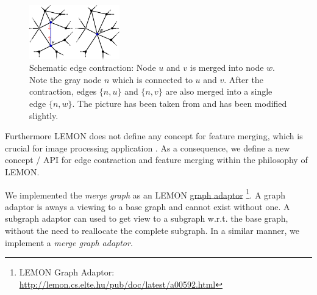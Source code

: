 \begin{figure}[H]
    \centering
    \includegraphics[width=0.35\textwidth]{fig/contraction.pdf}

    \caption[Schematic edge contraction]{ Schematic edge contraction: Node $u$ and $v$ is merged into node $w$.
        Note the gray node $n$ which is connected to $u$ and $v$.
        After the contraction, edges $\{ n,u\}$ and $\{ n,v\}$ are also merged into 
        a single edge $\{ n, w\}$.
        The picture has been taken from \citep{wiki_edge_contraction} and has been modified slightly.
    }
    \label{fig:figlabel}
\end{figure}


Furthermore LEMON does not define any concept for feature merging, which
is crucial for image processing application \citep{arbelaez_2006_cvpr}.
As a consequence, we define a new concept / API for 
edge contraction and feature merging within the philosophy of LEMON.

We implemented the \emph{merge graph} as an LEMON  \href{http://lemon.cs.elte.hu/pub/doc/latest/a00592.html}{graph adaptor}
\footnote{ LEMON Graph Adaptor: \url{http://lemon.cs.elte.hu/pub/doc/latest/a00592.html} }.
A graph adaptor is aways a viewing to a base graph and cannot exist without one.
A subgraph adaptor can used to get view to a subgraph w.r.t. the base graph, without
the need to reallocate the complete subgraph.
In a similar manner, we implement a \emph{merge graph adaptor}.

